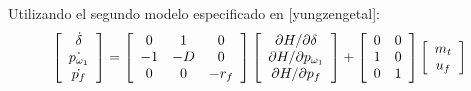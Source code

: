 Utilizando el segundo modelo especificado en [yungzengetal]:
\[
\left[
\begin{array}{c}
\dot{\delta}\\
\dot{p_{\omega_1}}\\
\dot{p_f}
\end{array}
\right]
=
\left[
\begin{array}{c c c}
0&1&0\\
-1&-D&0\\
0&0&-r_f
\end{array}
\right]
\left[
\begin{array}{c}
\partial H/\partial\delta\\
\partial H/\partial p_{\omega_1}\\
\partial H/\partial p_f
\end{array}
\right]
+
\left[
\begin{array}{c c}
0&0\\
1&0\\
0&1
\end{array}
\right]
\left[
\begin{array}{c}
m_t\\
u_f
\end{array}
\right]
\]



